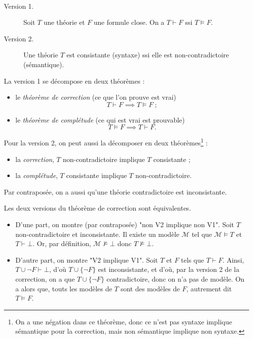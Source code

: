 \documentclass[./main]{subfiles}
\begin{document}
  \begin{thm}
    ~\\[-\baselineskip]
    \begin{description}
      \item[Version 1.]
        Soit $T$ une théorie et $F$ une formule close.
        On a $T \vdash F$ ssi $T \models F$.
      \item[Version 2.]
        Une théorie $T$ est consistante (syntaxe) ssi elle est non-contradictoire (sémantique).
    \end{description}
  \end{thm}

  \begin{rmk}
    La version 1 se décompose en deux théorèmes :
    \begin{itemize}
      \item le \textit{théorème de correction} (ce que l'on prouve est vrai)
        \[
        T \vdash F \implies T \models F\;
        ;\]
      \item le \textit{théorème de complétude} (ce qui est vrai est prouvable) \[
        T \models F \implies T\vdash F
        .\] 
    \end{itemize}

    Pour la version 2, on peut aussi la décomposer en deux théorèmes\footnote{On a une négation dans ce théorème, donc ce n'est pas syntaxe implique sémantique pour la correction, mais non sémantique implique non syntaxe.} :
    \begin{itemize}
      \item la \textit{correction}, $T$ non-contradictoire implique $T$ consistante ;
      \item la \textit{complétude}, $T$ consistante implique $T$ non-contradictoire.
    \end{itemize}
    Par contraposée, on a aussi qu'une théorie contradictoire est inconsistante.
  \end{rmk}

  \begin{prop}
    Les deux versions du théorème de correction sont équivalentes.
  \end{prop}
  \begin{prv}
    \begin{itemize}
      \item D'une part, on montre (par contraposée) "non V2 implique non V1".
        Soit $T$ non-contradictoire et inconsistante.
        Il existe un modèle $\mathcal{M}$ tel que $\mathcal{M} \models T$ et $T \vdash \bot$.
        Or, par définition, $\mathcal{M} \not\models \bot$ donc $T \not\models \bot$.
      \item D'autre part, on montre "V2 implique V1".
        Soit $T$ et $F$ tels que $T \vdash F$.
        Ainsi, $T \cup \lnot F \vdash \bot$, d'où $T \cup \{\lnot F\}$ est inconsistante, et d'où, par la version 2 de la correction, on a que $T \cup \{\lnot F\}$ contradictoire, donc on n'a pas de modèle.
        On a alors que, touts les modèles de $T$ sont des modèles de $F$, autrement dit $T \models F$.
    \end{itemize}
  \end{prv}
\end{document}
